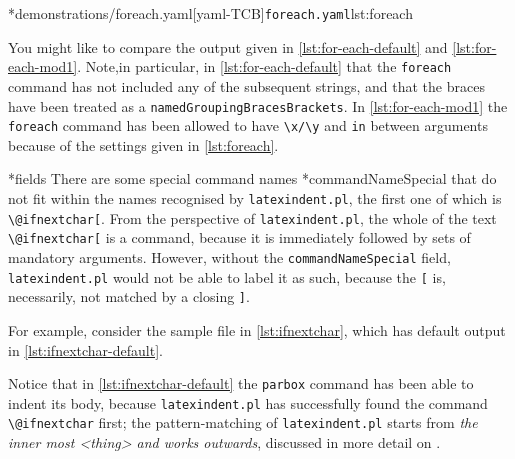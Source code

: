	\begin{cmhtcbraster}[raster column skip=.1\linewidth]
		\cmhlistingsfromfile[style=yaml-LST]*{demonstrations/foreach.yaml}[yaml-TCB]{\texttt{foreach.yaml}}{lst:foreach}
	\end{cmhtcbraster}

	You might like to compare the output given in \cref{lst:for-each-default} and
	\cref{lst:for-each-mod1}. Note,in particular, in \cref{lst:for-each-default} that the
	\texttt{foreach} command has not included any of the subsequent strings, and that
	the braces have been treated as a \texttt{namedGroupingBracesBrackets}. In \cref{lst:for-each-mod1} the
	\texttt{foreach} command has been allowed to have \lstinline!\x/\y! and
	\texttt{in} between arguments because of the settings given in
	\cref{lst:foreach}.

*{fields}
	There are some special command names%
	*{commandNameSpecial} that do not fit within the names recognised by
	\texttt{latexindent.pl}, the first one of which is \lstinline!\@ifnextchar[!. From the
	perspective of \texttt{latexindent.pl}, the whole of the text \lstinline!\@ifnextchar[! is
	a command, because it is immediately followed by sets of mandatory arguments. However,
	without the \texttt{commandNameSpecial} field, \texttt{latexindent.pl} would not be able to
	label it as such, because the \lstinline![! is, necessarily, not matched by a
	closing \lstinline!]!.

	For example, consider the sample file in \cref{lst:ifnextchar}, which has default
	output in \cref{lst:ifnextchar-default}.

	\begin{cmhtcbraster}[raster column skip=.1\linewidth]
	\end{cmhtcbraster}

	Notice that in \cref{lst:ifnextchar-default} the \texttt{parbox} command has been able
	to indent its body, because \texttt{latexindent.pl} has successfully found the command
	\lstinline!\@ifnextchar! first; the pattern-matching of \texttt{latexindent.pl} starts
	from \emph{the inner most <thing> and works outwards}, discussed in more detail on .

